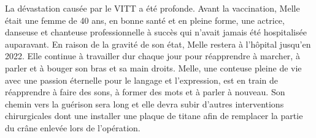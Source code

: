{La dévastation causée par le VITT a été profonde. Avant la vaccination, Melle
était une femme de 40 ans, en bonne santé et en pleine forme, une actrice,
danseuse et chanteuse professionnelle à succès qui n'avait jamais été
hospitalisée auparavant. En raison de la gravité de son état, Melle restera à
l'hôpital jusqu'en 2022. Elle continue à travailler dur chaque jour pour
réapprendre à marcher, à parler et à bouger son bras et sa main droits. Melle,
une conteuse pleine de vie avec une passion éternelle pour le langage et
l'expression, est en train de réapprendre à faire des sons, à former des mots et
à parler à nouveau. Son chemin vers la guérison sera long et elle devra subir
d'autres interventions chirurgicales dont une installer une plaque de titane
afin de remplacer la partie du crâne enlevée lors de l'opération.

}
